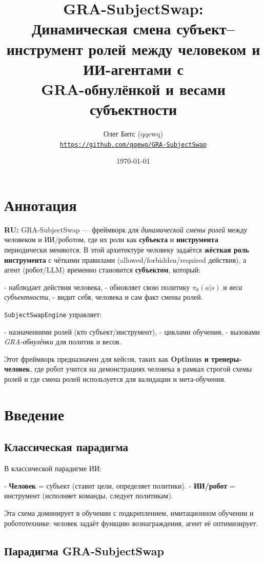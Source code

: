 \documentclass[11pt,a4paper]{article}
\title{
    \textbf{GRA-SubjectSwap:}\\
    Динамическая смена субъект–инструмент ролей между человеком и ИИ-агентами с\\
    GRA-обнулёнкой и весами субъектности
}
\author{
    Олег Битс (qqewq)\\
    \href{https://github.com/qqewq/GRA-SubjectSwap}{\texttt{https://github.com/qqewq/GRA-SubjectSwap}}
}
\date{\today}
\begin{document}
\maketitle

\tableofcontents
\section*{Аннотация}

\textbf{RU:}  
GRA-SubjectSwap — фреймворк для \textit{динамической смены ролей} между человеком и ИИ/роботом, где их роли как \textbf{субъекта} и \textbf{инструмента} периодически меняются.  
В этой архитектуре человеку задаётся \textbf{жёсткая роль инструмента} с чёткими правилами (allowed/forbidden/required действия), а агент (робот/LLM) временно становится \textbf{субъектом}, который:

- наблюдает действия человека,
- обновляет свою политику \(\pi_\theta(a|s)\) и \textit{веса субъектности},
- видит себя, человека и сам факт смены ролей.

\texttt{SubjectSwapEngine} управляет:

- назначениями ролей (кто субъект/инструмент),
- циклами обучения,
- вызовами \textit{GRA-обнулёнки} для политик и весов.

Этот фреймворк предназначен для кейсов, таких как \textbf{Optimus и тренеры-человек}, где робот учится на демонстрациях человека в рамках строгой схемы ролей и где смена ролей используется для валидации и мета-обучения.

\section{Введение}

\subsection{Классическая парадигма}

В классической парадигме ИИ:

- \textbf{Человек} = субъект (ставит цели, определяет политики).
- \textbf{ИИ/робот} = инструмент (исполняет команды, следует политикам).

Эта схема доминирует в обучении с подкреплением, имитационном обучении и робототехнике: человек задаёт функцию вознаграждения, агент её оптимизирует.

\subsection{Парадигма GRA-SubjectSwap}
\end{document}
